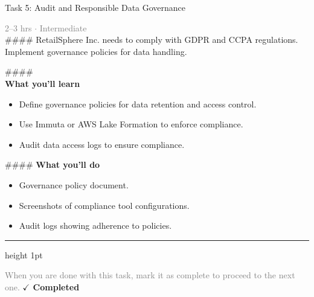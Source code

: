 \documentclass[10pt,a4paper]{article}
\begin{document}
\begin{taskbox}{Task 5: Audit and Responsible Data Governance}

    {\small \textcolor{gray}{2--3 hrs $\cdot$ Intermediate}}\\[12pt]

    \#\#\#\#   
RetailSphere Inc. needs to comply with GDPR and CCPA regulations. Implement governance policies for data handling.

\#\#\#\# \\[10pt]
\vspace{8pt}
{\large \textbf{\textcolor{brandLight}{What you'll learn}}}\\[4pt]  
\begin{itemize}
    \item Define governance policies for data retention and access control.  
    \item Use Immuta or AWS Lake Formation to enforce compliance.  
    \item Audit data access logs to ensure compliance.  
\end{itemize}

\#\#\#\# \vspace{8pt}
{\large \textbf{\textcolor{brandLight}{What you'll do}}}\\[4pt]  
\begin{itemize}
    \item Governance policy document.  
    \item Screenshots of compliance tool configurations.  
    \item Audit logs showing adherence to policies.\par
\end{itemize}

    \vspace{16pt}

    \textcolor{cardBorder}{\hrule height 1pt}\vspace{8pt}

    \small \textcolor{gray}{When you are done with this task, mark it as complete to proceed to the next one.} \hfill \textbf{\textcolor{brandDark}{$\checkmark$ Completed}}

\end{taskbox}
\end{document}
